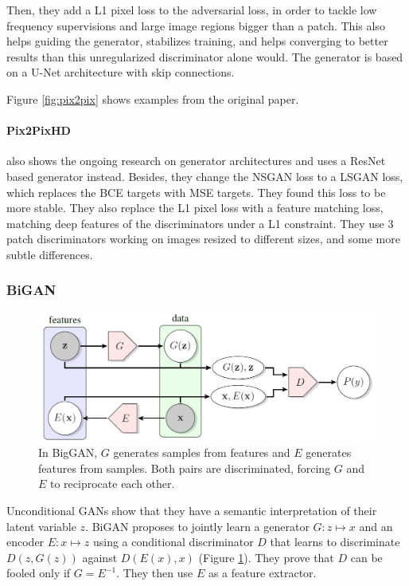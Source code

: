 Then, they add a L1 pixel loss to the adversarial loss, in order to tackle low frequency supervisions and large image regions bigger than a patch. This also helps guiding the generator, stabilizes training, and helps converging to better results than this unregularized discriminator alone would. The generator is based on a U-Net architecture with skip connections.

Figure \ref{fig:pix2pix} shows examples from the original paper.

\paragraph{Pix2PixHD} also shows the ongoing research on generator architectures and uses a ResNet based generator instead. Besides, they change the \ac{NSGAN} loss to a \ac{LSGAN} loss, which replaces the \ac{BCE} targets with \ac{MSE} targets. They found this loss to be more stable. They also replace the L1 pixel loss with a feature matching loss, matching deep features of the discriminators under a L1 constraint. They use 3 patch discriminators working on images resized to different sizes, and some more subtle differences.

\subsubsection{BiGAN}

\begin{figure}
    \centering
    \includegraphics[width=0.6\columnwidth]{60-files/bigan.png}
    \caption{In BigGAN, $G$ generates samples from features and $E$ generates features from samples. Both pairs are discriminated, forcing $G$ and $E$ to reciprocate each other.}
    \label{fig:bigan}
\end{figure}

Unconditional GANs show that they have a semantic interpretation of their latent variable $z$. BiGAN \citep{bigan} proposes to jointly learn a generator $G: z \mapsto x$ and an encoder $E: x \mapsto z$ using a conditional discriminator $D$ that learns to discriminate $D(z, G(z))$ against $D(E(x), x)$ (Figure \ref{fig:bigan}). They prove that $D$ can be fooled only if $G = E^{-1}$. They then use $E$ as a feature extractor.

